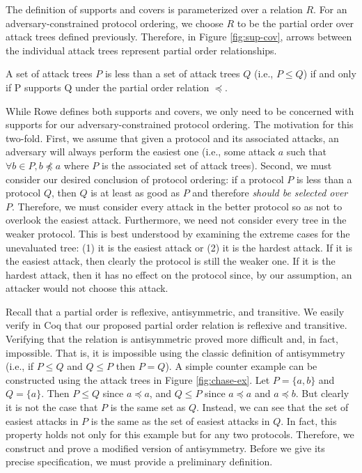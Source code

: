 \documentclass[runningheads]{llncs}
\theoremstyle{definition}
\begin{document}
The definition of supports and covers is parameterized over a relation $R$. For an adversary-constrained protocol ordering, we choose $R$ to be the partial order over attack trees defined previously. Therefore, in Figure \ref{fig:sup-cov}, arrows between the individual attack trees represent partial order relationships.

\begin{definition}
  A set of attack trees $P$ is less than a set of attack trees $Q$ (i.e., $P \leq Q$) if and only if P supports Q under the partial order relation $\preceq$.
\end{definition} 

While Rowe defines both supports and covers, we only need to be concerned with supports for our adversary-constrained protocol ordering. The motivation for this two-fold. First, we assume that given a protocol and its associated attacks, an adversary will always perform the easiest one (i.e., some attack $a$ such that $\forall b \in P, b \npreceq a$ where $P$ is the associated set of attack trees). Second, we must consider our desired conclusion of protocol ordering: if a protocol $P$ is less than a protocol $Q$, then $Q$ is at least as good as $P$ and therefore \emph{should be selected over $P$}. Therefore, we must consider every attack in the better protocol so as not to overlook the easiest attack. Furthermore, we need not consider every tree in the weaker protocol. This is best understood by examining the extreme cases for the unevaluated tree: (1) it is the easiest attack or (2) it is the hardest attack. If it is the easiest attack, then clearly the protocol is still the weaker one. If it is the hardest attack, then it has no effect on the protocol since, by our assumption, an attacker would not choose this attack.

Recall that a partial order is reflexive, antisymmetric, and transitive. We easily verify in Coq that our proposed partial order relation is reflexive and transitive. Verifying that the relation is antisymmetric proved more difficult and, in fact, impossible. That is, it is impossible using the classic definition of antisymmetry (i.e., if $P \le Q$ and $Q \le P$ then $P = Q$). A simple counter example can be constructed using the attack trees in Figure \ref{fig:chase-ex}. Let $P = \{a,b\}$ and $Q = \{a\}$. Then $P \le Q$ since $a \preceq a$, and $Q \le P$ since $a \preceq a$ and $a \preceq b$. But clearly it is not the case that $P$ is the same set as $Q$. Instead, we can see that the set of easiest attacks in $P$ is the same as the set of easiest attacks in $Q$. In fact, this property holds not only for this example but for any two protocols. Therefore, we construct and prove a modified version of antisymmetry. Before we give its precise specification, we must provide a preliminary definition.
\end{document}
